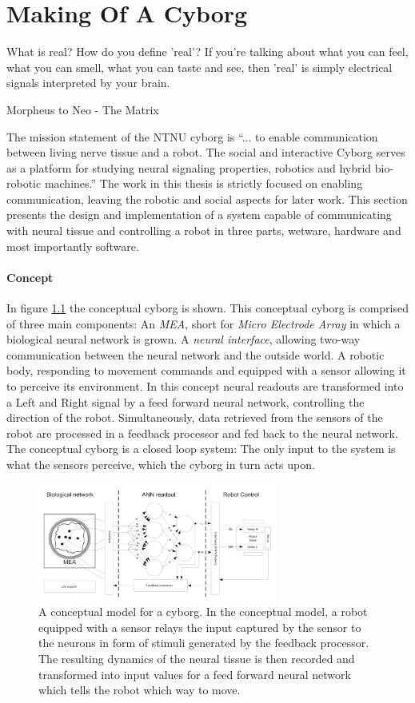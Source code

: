 \chapter{Making Of A Cyborg}
\epigraph{What is real? How do you define 'real'? If you're talking about what
you can feel, what you can smell, what you can taste and see, then 'real' is
simply electrical signals interpreted by your brain.}
{Morpheus to Neo - The Matrix}
The mission statement of the NTNU cyborg is ``... to enable communication
between living nerve tissue and a robot. The social and interactive Cyborg
serves as a platform for studying neural signaling properties, robotics and
hybrid bio-robotic machines.'' \cite{ntnu_cyborg}
The work in this thesis is strictly focused on enabling communication, leaving
the robotic and social aspects for later work.
This section presents the design and implementation of a system capable of
communicating with neural tissue and controlling a robot in three parts,
wetware, hardware and most importantly software.
\subsubsection{Concept}
In figure \ref{figOverviewSimple} the conceptual cyborg is shown.
This conceptual cyborg is comprised of three main components: An \emph{MEA}, short
for \emph{Micro Electrode Array} in which a biological neural network is grown.
A \emph{neural interface}, allowing two-way communication between the neural network and
the outside world.
A robotic body, responding to movement commands and equipped with a sensor
allowing it to perceive its environment.
In this concept neural readouts are transformed into a Left and Right signal by
a feed forward neural network, controlling the direction of the robot.
Simultaneously, data retrieved from the sensors of the robot are processed in a
feedback processor and fed back to the neural network.
The conceptual cyborg is a closed loop system: The only input to the system is
what the sensors perceive, which the cyborg in turn acts upon.
\begin{figure}[h]
  \centering
  \includegraphics[width=0.7\textwidth]{fig/cyborg_overview.png}
  \caption[Conceptual cyborg]{
    A conceptual model for a cyborg.
    In the conceptual model, a robot equipped with a sensor relays the input
    captured by the sensor to the neurons in form of stimuli generated by the
    feedback processor.
    The resulting dynamics of the neural tissue is then recorded and transformed
    into input values for a feed forward neural network which tells the robot
    which way to move. 
  }
  \label{figOverviewSimple}
\end{figure}
